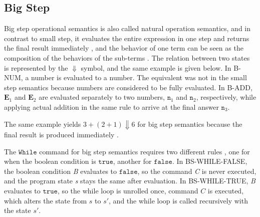 \documentclass[a4paper,11pt,twoside]{report}
\begin{document}
\begin{mathpar}
\end{mathpar}

\subsection{Big Step}
Big step operational semantics is also called natural operation semantics, and in contrast to small step, it evaluates the entire expression in one step and returns the final result immediately \cite{Lecture2}, and the behavior of one term can be seen as the composition of the behaviors of the sub-terms \cite{chargueraud-13-pretty}. The relation between two states is represented by the $\Downarrow$ symbol, and the same example is given below. In B-NUM, a number is evaluated to a number. The equivalent was not in the small step semantics because numbers are considered to be fully evaluated. In B-ADD, $\mathbf{E}_1$ and $\mathbf{E}_2$ are evaluated separately to two numbers, $\texttt{n}_1$ and $\texttt{n}_2$, respectively, while applying actual addition in the same rule to arrive at the final answer $\texttt{n}_3$.


The same example yields $3 + ( 2 + 1 ) \Downarrow 6 $ for big step semantics because the final result is produced immediately \cite{Lecture2}. 

 The $\mathtt{While}$ command for big step semantics requires two different rules \cite{LectureBS}, one for when the boolean condition is $\mathtt{true}$, another for $\mathtt{false}$. In BS-WHILE-FALSE, the boolean condition \textit{B} evaluates to $\mathtt{false}$, so the command \textit{C} is never executed, and the program state \textit{s} stays the same after evaluation. In BS-WHILE-TRUE, \textit{B} evaluates to $\mathtt{true}$, so the while loop is unrolled once, command $C$ is executed, which alters the state from $s$ to $s'$, and the while loop is called recursively with the state $s'$.
\end{document}
